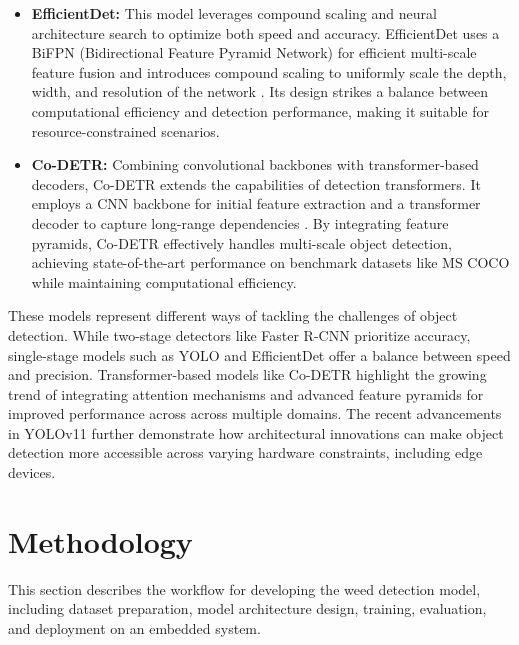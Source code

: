 \documentclass[conference]{IEEEtran}
\begin{document}
\begin{itemize}
    \item \textbf{EfficientDet:} This model leverages compound scaling and neural architecture search to optimize both speed and accuracy. EfficientDet uses a BiFPN (Bidirectional Feature Pyramid Network) for efficient multi-scale feature fusion and introduces compound scaling to uniformly scale the depth, width, and resolution of the network \cite{tan2020efficientdet}. Its design strikes a balance between computational efficiency and detection performance, making it suitable for resource-constrained scenarios.
    
    \item \textbf{Co-DETR:} Combining convolutional backbones with transformer-based decoders, Co-DETR extends the capabilities of detection transformers. It employs a CNN backbone for initial feature extraction and a transformer decoder to capture long-range dependencies \cite{zong2022code}. By integrating feature pyramids, Co-DETR effectively handles multi-scale object detection, achieving state-of-the-art performance on benchmark datasets like MS COCO while maintaining computational efficiency.
\end{itemize}

These models represent different ways of tackling the challenges of object detection. While two-stage detectors like Faster R-CNN prioritize accuracy, single-stage models such as YOLO and EfficientDet offer a balance between speed and precision. Transformer-based models like Co-DETR highlight the growing trend of integrating attention mechanisms and advanced feature pyramids for improved performance across across multiple domains. The recent advancements in YOLOv11 further demonstrate how architectural innovations can make object detection more accessible across varying hardware constraints, including edge devices.

\section{Methodology}

This section describes the workflow for developing the weed detection model, including dataset preparation, model architecture design, training, evaluation, and deployment on an embedded system. 
\end{document}
